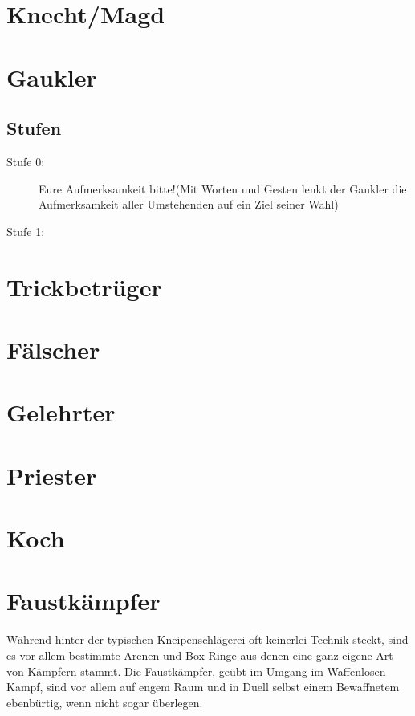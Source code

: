 \documentclass[a4paper,12pt,oneside]{book}
\begin{document}
\section{Knecht/Magd}

\section{Gaukler}

\subsection{Stufen}
\begin{description}
\item[Stufe 0:]Eure Aufmerksamkeit bitte!(Mit Worten und Gesten lenkt der Gaukler die Aufmerksamkeit aller Umstehenden auf ein Ziel seiner Wahl)
\item[Stufe 1:]
\end{description}
\section{Trickbetrüger}

\section{Fälscher}

\section{Gelehrter}

\section{Priester}

\section{Koch}

\section{Faustkämpfer}
Während hinter der typischen Kneipenschlägerei oft keinerlei Technik steckt, sind es vor allem bestimmte Arenen und Box-Ringe aus denen eine ganz eigene Art von Kämpfern stammt. Die Faustkämpfer, geübt im Umgang im Waffenlosen Kampf, sind vor allem auf engem Raum und in Duell selbst einem Bewaffnetem ebenbürtig, wenn nicht sogar überlegen.
\end{document}
